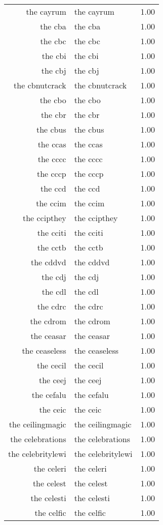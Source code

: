 \begin{table}[ht]
\begin{tabular}{rlr}
  the cayrum & the cayrum & 1.00 \\ 
  the cba & the cba & 1.00 \\ 
  the cbc & the cbc & 1.00 \\ 
  the cbi & the cbi & 1.00 \\ 
  the cbj & the cbj & 1.00 \\ 
  the cbnutcrack & the cbnutcrack & 1.00 \\ 
  the cbo & the cbo & 1.00 \\ 
  the cbr & the cbr & 1.00 \\ 
  the cbus & the cbus & 1.00 \\ 
  the ccas & the ccas & 1.00 \\ 
  the cccc & the cccc & 1.00 \\ 
  the cccp & the cccp & 1.00 \\ 
  the ccd & the ccd & 1.00 \\ 
  the ccim & the ccim & 1.00 \\ 
  the ccipthey & the ccipthey & 1.00 \\ 
  the cciti & the cciti & 1.00 \\ 
  the cctb & the cctb & 1.00 \\ 
  the cddvd & the cddvd & 1.00 \\ 
  the cdj & the cdj & 1.00 \\ 
  the cdl & the cdl & 1.00 \\ 
  the cdrc & the cdrc & 1.00 \\ 
  the cdrom & the cdrom & 1.00 \\ 
  the ceasar & the ceasar & 1.00 \\ 
  the ceaseless & the ceaseless & 1.00 \\ 
  the cecil & the cecil & 1.00 \\ 
  the ceej & the ceej & 1.00 \\ 
  the cefalu & the cefalu & 1.00 \\ 
  the ceic & the ceic & 1.00 \\ 
  the ceilingmagic & the ceilingmagic & 1.00 \\ 
  the celebrations & the celebrations & 1.00 \\ 
  the celebritylewi & the celebritylewi & 1.00 \\ 
  the celeri & the celeri & 1.00 \\ 
  the celest & the celest & 1.00 \\ 
  the celesti & the celesti & 1.00 \\ 
  the celfic & the celfic & 1.00 \\ 

\end{tabular}
\end{table}

